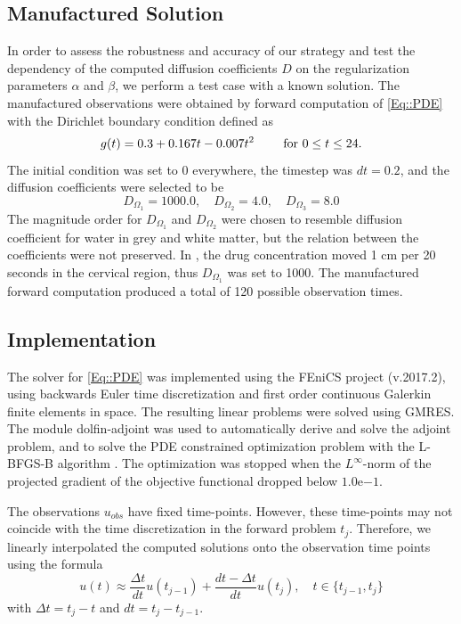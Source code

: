 \documentclass[12pt,a4paper]{article}
\begin{document}
\subsection{Manufactured Solution}
In order to assess the robustness and accuracy of our strategy and test the dependency of the computed diffusion coefficients $D$ on the
regularization parameters $\alpha$ and $\beta$, we perform a test case with a
known solution. The manufactured observations were obtained by forward computation of \eqref{Eq::PDE} with the Dirichlet boundary condition defined as
\begin{equation}
g(t) = 0.3 +0.167t - 0.007t\sp{2} \qquad \text{ for } 0 \leq t \leq 24.
\label{EQ::DIRI}
\end{equation}
The initial condition was set to 0 everywhere, the timestep was $dt = 0.2$, and the diffusion coefficients were selected to be 
\begin{equation}
D_{\Omega_1} = 1000.0, \quad D_{\Omega_2} = 4.0, \quad D_{\Omega_3} = 8.0 
\end{equation}  
The magnitude order for $D_{\Omega_1} $ and $D_{\Omega_2}$ were chosen to resemble diffusion coefficient for water in grey and white matter, but the relation between the coefficients were not preserved. In \citet{Haga}, the drug concentration moved 1 cm per 20 seconds in the cervical region, thus $D_{\Omega_1}$  was set to 1000. The manufactured forward computation produced a total of 120 possible observation times.


\subsection{Implementation}
The solver for \eqref{Eq::PDE} was implemented using the FEniCS project (v.2017.2), using backwards Euler time discretization and first order continuous Galerkin finite elements in space. The resulting linear problems were solved using GMRES.
The module dolfin-adjoint \cite{farrell2013automated, funke2013framework} was used to automatically derive and solve the adjoint problem, and to solve the PDE constrained optimization problem with the L-BFGS-B algorithm \cite{LBFGSB1, LBFGSB2}. The optimization was stopped when the $L^\infty$-norm of the projected gradient of the objective functional dropped below $1.0\mathrm{e}{-1}$.

The observations $u_{obs}$ have fixed time-points. However, these time-points may not coincide  with the time discretization in the forward problem $t_j$. Therefore, we linearly interpolated the computed solutions onto the observation time points using the formula
\begin{equation}
\label{observation:interpolation}
u(t) \approx \frac{\Delta t}{dt} u(t_{j-1}) + \frac{dt - \Delta t }{dt} u(t_{j}), \quad t \in \lbrace t_{j-1}, t_j \rbrace
\end{equation}
with $\Delta t = t_j-t$ and $dt = t_j - t_{j-1}$.
\end{document}
